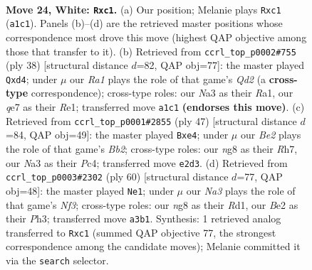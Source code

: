 \documentclass[11pt]{article}
\begin{document}
\clearpage

\begin{figure}[p]\centering
\begin{subfigure}{0.46\textwidth}\centering
\resizebox{\linewidth}{!}{%
\newchessgame
\chessboard[
  setfen={r2k2n1/1b2q3/8/p1p1Pp1r/3p3p/NP5P/P3B1PQ/R1b3KR w - - 0 24},
  showmover=false,
  pgfstyle=straightmove, color=movearrow, markmove={a1-c1}
]}
\caption{}
\end{subfigure}\hfill
\begin{subfigure}{0.46\textwidth}\centering
\resizebox{\linewidth}{!}{%
\newchessgame
\chessboard[
  setfen={r2qr3/1p3ppk/p3b3/P2p4/1P1b1B2/7P/3Q1PP1/R3R1K1 w - - 0 20},
  showmover=false,
  pgfstyle=straightmove, color=movearrow, markmove={d2-d4}
]}
\caption{}
\end{subfigure}
\\[4pt]
\begin{subfigure}{0.46\textwidth}\centering
\resizebox{\linewidth}{!}{%
\newchessgame
\chessboard[
  setfen={1r3k2/1b2qppr/p7/1p2pP2/2p1N3/P5QP/1PP1B3/1K1R2R1 b - - 0 24},
  showmover=false,
  pgfstyle=straightmove, color=movearrow, markmove={b7-e4}
]}
\caption{}
\end{subfigure}\hfill
\begin{subfigure}{0.46\textwidth}\centering
\resizebox{\linewidth}{!}{%
\newchessgame
\chessboard[
  setfen={r5k1/1p1q2p1/2b2p1p/r7/1p1P4/1P1Q1N1P/P1R2PP1/3R2K1 w - - 0 31},
  showmover=false,
  pgfstyle=straightmove, color=movearrow, markmove={f3-e1}
]}
\caption{}
\end{subfigure}
\caption{\textbf{Move 24, White: \texttt{Rxc1}.} (a) Our position; Melanie plays \texttt{Rxc1} (\texttt{a1c1}). Panels (b)--(d) are the retrieved master positions whose correspondence most drove this move (highest QAP objective among those that transfer to it). (b) Retrieved from \texttt{ccrl\_top\_p0002\#755} (ply 38) [structural distance $d$=82, QAP obj=77]: the master played \texttt{Qxd4}; under $\mu$ our \emph{Ra1} plays the role of that game's \emph{Qd2} (a \textbf{cross-type} correspondence); cross-type roles: our \emph{N}a3 as their \emph{R}a1, our \emph{q}e7 as their \emph{R}e1; transferred move \texttt{a1c1} \textbf{(endorses this move)}. (c) Retrieved from \texttt{ccrl\_top\_p0001\#2855} (ply 47) [structural distance $d$=84, QAP obj=49]: the master played \texttt{Bxe4}; under $\mu$ our \emph{Be2} plays the role of that game's \emph{Bb2}; cross-type roles: our \emph{n}g8 as their \emph{R}h7, our \emph{N}a3 as their \emph{P}c4; transferred move \texttt{e2d3}. (d) Retrieved from \texttt{ccrl\_top\_p0003\#2302} (ply 60) [structural distance $d$=77, QAP obj=48]: the master played \texttt{Ne1}; under $\mu$ our \emph{Na3} plays the role of that game's \emph{Nf3}; cross-type roles: our \emph{n}g8 as their \emph{R}d1, our \emph{B}e2 as their \emph{P}h3; transferred move \texttt{a3b1}. Synthesis: 1 retrieved analog transferred to \texttt{Rxc1} (summed QAP objective 77, the strongest correspondence among the candidate moves); Melanie committed it via the \texttt{search} selector.}
\label{fig:thought-m46}
\end{figure}
\end{document}
